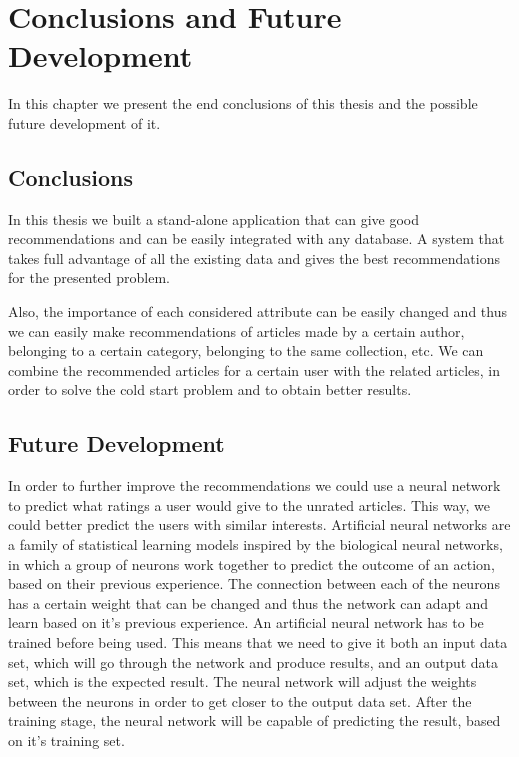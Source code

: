 \chapter{Conclusions and Future Development}
\label{chapter:conclusions-future-development}
In this chapter we present the end conclusions of this thesis and the possible future development of it.

\section{Conclusions} 
\label{sec:conclusions}
In this thesis we built a stand-alone application that can give good recommendations and can be easily integrated with any database. A system that takes full advantage of all the existing data and gives the best recommendations for the presented problem.

Also, the importance of each considered attribute can be easily changed and thus we can easily make recommendations of articles made by a certain author, belonging to a certain category, belonging to the same collection, etc. 
We can combine the recommended articles for a certain user with the related articles, in order to solve the cold start problem and to obtain better results.

\section{Future Development} 
\label{sec:future-development}

In order to further improve the recommendations we could use a neural network to predict what ratings a user would give to the unrated articles\cite{netflix-recommender}. This way, we could better predict the users with similar interests.
Artificial neural networks are a family of statistical learning models inspired by the biological neural networks, in which a group of neurons work together to predict the outcome of an action, based on their previous experience. The connection between each of the neurons has a certain weight that can be changed and thus the network can adapt and learn based on it's previous experience. An artificial neural network has to be trained before being used. This means that we need to give it both an input data set, which will go through the network and produce results, and an output data set, which is the expected result. The neural network will adjust the weights between the neurons in order to get closer to the output data set. After the training stage, the neural network will be capable of predicting the result, based on it's training set.


